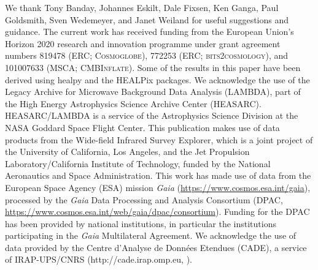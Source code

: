 \documentclass{aa}
\begin{document}
\begin{acknowledgements}
  We thank Tony Banday, Johannes Eskilt, Dale Fixsen, Ken Ganga, Paul
  Goldsmith, Sven Wedemeyer, and Janet Weiland for useful suggestions
  and guidance.  The current work has received funding from the
  European Union’s Horizon 2020 research and innovation programme
  under grant agreement numbers 819478 (ERC; \textsc{Cosmoglobe}),
  772253 (ERC; \textsc{bits2cosmology}), and 101007633 (MSCA;
  \textsc{CMBInflate}).  Some of the results in this paper have been
  derived using healpy \citep{Zonca2019} and the HEALPix
  \citep{healpix} packages.  We acknowledge the use of the Legacy
  Archive for Microwave Background Data Analysis (LAMBDA), part of the
  High Energy Astrophysics Science Archive Center
  (HEASARC). HEASARC/LAMBDA is a service of the Astrophysics Science
  Division at the NASA Goddard Space Flight Center. This publication
  makes use of data products from the Wide-field Infrared Survey
  Explorer, which is a joint project of the University of California,
  Los Angeles, and the Jet Propulsion Laboratory/California Institute
  of Technology, funded by the National Aeronautics and Space
  Administration. This work has made use of data from the European
  Space Agency (ESA) mission {\it Gaia}
  (\url{https://www.cosmos.esa.int/gaia}), processed by the {\it Gaia}
  Data Processing and Analysis Consortium (DPAC,
  \url{https://www.cosmos.esa.int/web/gaia/dpac/consortium}). Funding
  for the DPAC has been provided by national institutions, in
  particular the institutions participating in the {\it Gaia}
  Multilateral Agreement.
  We acknowledge the use of data provided by the Centre d'Analyse de Données Etendues (CADE), a service of IRAP-UPS/CNRS (http://cade.irap.omp.eu, \citealt{paradis:2012}). 
\end{acknowledgements}


%



\end{document}
